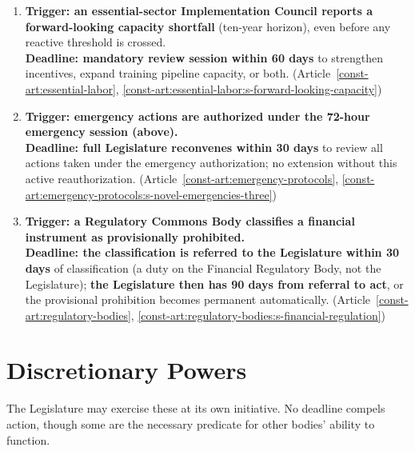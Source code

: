\documentclass[11pt]{article}
\begin{document}
\begin{enumerate}
  \item \textbf{Trigger: an essential-sector Implementation Council reports a forward-looking capacity shortfall} (ten-year horizon), even before any reactive threshold is crossed.
  \\ \textbf{Deadline: mandatory review session within 60 days} to strengthen incentives, expand training pipeline capacity, or both. (Article~\ref{const-art:essential-labor}, \ref{const-art:essential-labor:s-forward-looking-capacity})

  \item \textbf{Trigger: emergency actions are authorized under the 72-hour emergency session (above).}
  \\ \textbf{Deadline: full Legislature reconvenes within 30 days} to review all actions taken under the emergency authorization; no extension without this active reauthorization. (Article~\ref{const-art:emergency-protocols}, \ref{const-art:emergency-protocols:s-novel-emergencies-three})

  \item \textbf{Trigger: a Regulatory Commons Body classifies a financial instrument as provisionally prohibited.}
  \\ \textbf{Deadline: the classification is referred to the Legislature within 30 days} of classification (a duty on the Financial Regulatory Body, not the Legislature); \textbf{the Legislature then has 90 days from referral to act}, or the provisional prohibition becomes permanent automatically. (Article~\ref{const-art:regulatory-bodies}, \ref{const-art:regulatory-bodies:s-financial-regulation})

\end{enumerate}

\section{Discretionary Powers}

The Legislature may exercise these at its own initiative. No deadline compels action, though some are the necessary predicate for other bodies' ability to function.
\end{document}
